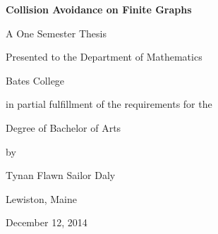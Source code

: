 

\vspace*{4cm} 

\centerline{\LARGE \textbf{Collision Avoidance on Finite Graphs}}
\bigskip\bigskip
\centerline{\Large  A One Semester Thesis}
\medskip
\centerline{\Large Presented to the Department of Mathematics}
\medskip
\centerline{\Large Bates College}
\medskip
\centerline{\Large in partial fulfillment of the requirements for the}
\medskip
\centerline{\Large Degree of Bachelor of Arts}
\medskip
\centerline{\Large by}
\medskip
\centerline{\Large Tynan Flawn Sailor Daly}
\medskip
\centerline{\Large Lewiston, Maine}
\medskip
\centerline{\Large December 12, 2014}

\newpage

